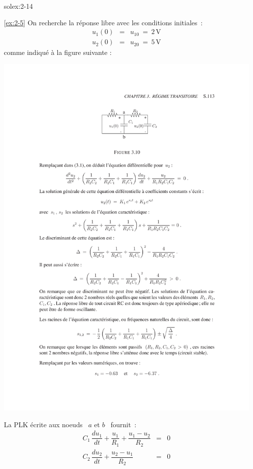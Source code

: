 \begin{exwithsol}{solex:2-14}
\begin{solexercise}{\ref{ex:2-5}}
	\label{solex:2-5}
On recherche la r\'eponse libre avec les conditions initiales~:
\begin{eqnarray*}
	u_1(0) &=& u_{10} \: = \: 2\, \mbox{V}\\
	u_2(0) &=& u_{20} \: = \: 5\, \mbox{V}
\end{eqnarray*}
comme indiqu\'e \`a la figure suivante :
\begin{center}
	\includegraphics[width=\linewidth]{sol_exercices/ex3-5}
\end{center}
La PLK \'ecrite aux noeuds \ $a$ et $b$ \ fournit~:
\begin{eqnarray}
C_1 \, \dfrac{du_1}{dt} + \dfrac{u_1}{R_1} + \dfrac{u_1-u_2}{R_2} 
&=& 0 \label{1}\\C_2 \, \dfrac{du_2}{dt} +  \dfrac{u_2-u_1}{R_2} &=& 0 \label{2}
\end{eqnarray}

\end{solexercise}
\end{exwithsol}
